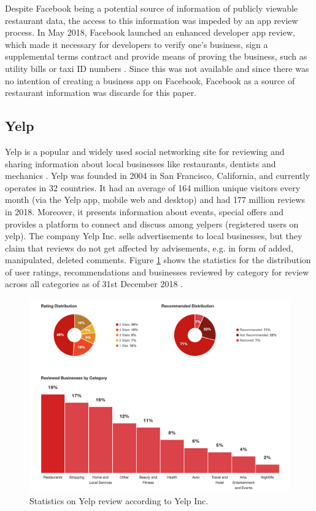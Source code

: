 \documentclass[a4paper, 11pt, oneside]{Thesis}  %
\begin{document}
Despite Facebook being a potential source of information of publicly viewable restaurant data, the access to this information was impeded by an app review process. In May 2018, Facebook launched an enhanced developer app review, which made it necessary for developers to verify one's business, sign a supplemental terms contract and provide means of proving the business, such as utility bills or taxi ID numbers \cite{KonstantinosPapamiltiadis.01.05.2018}. Since this was not available and since there was no intention of creating a business app on Facebook, Facebook as a source of restaurant information was discarde for this paper.

\subsection{Yelp}

Yelp is a popular and widely used social networking site for reviewing and sharing information about local businesses like restaurants, dentists and mechanics \cite{YelpInc..2018}. Yelp was founded in 2004 in San Francisco, California, and currently operates in 32 countries. It had an average of 164 million unique visitors every month (via the Yelp app, mobile web and desktop) and had 177 million reviews in 2018. Moreover, it presents information about events, special offers and provides a platform to connect and discuss among yelpers (registered users on yelp). The company Yelp Inc. sells advertisements to local businesses, but they claim that reviews do not get affected by advisements, e.g. in form of added, manipulated, deleted comments. Figure \ref{fig:yelp_factsheet_figures} shows the statistics for the distribution of user ratings, recommendations and businesses reviewed by category for review across all categories as of 31st December 2018 \cite{YelpInc..2018}.

\begin{figure}[h]
\includegraphics[scale=0.5]{Figures/Yelp_Factsheet_Figures.png}
\centering
\caption{Statistics on Yelp review according to Yelp Inc. \cite{YelpInc..2018}}
\label{fig:yelp_factsheet_figures}
\end{figure}
\end{document}
